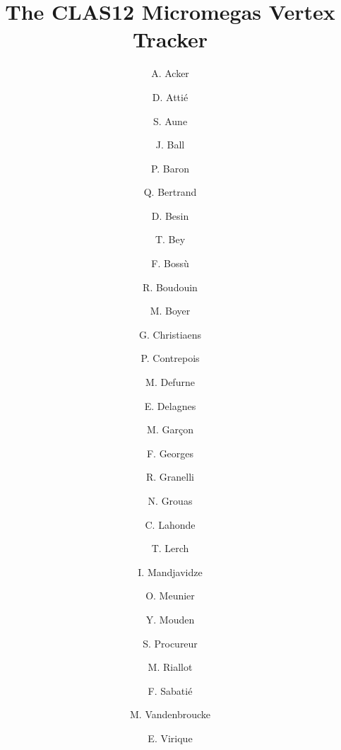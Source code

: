 \title{The CLAS12 Micromegas Vertex Tracker}

\author{A. Acker} 
\author{D. Atti\'e}
\author{S. Aune}
\author{J. Ball}
\author{P. Baron}
\author{Q. Bertrand}
\author{D. Besin}
\author{T. Bey}
\author{F. Boss\`u}
\author{R. Boudouin}
\author{M. Boyer}
\author{G. Christiaens}
\author{P. Contrepois}
\author{M. Defurne}
\author{E. Delagnes}
\author{M. Gar\c con}
\author{F. Georges}
\author{R. Granelli}
\author{N. Grouas}
\author{C. Lahonde}
\author{T. Lerch}
\author{I. Mandjavidze}
\author{O. Meunier}
\author{Y. Mouden}
\author{S. Procureur}
\author{M. Riallot}
\author{F. Sabati\'e}
\author{M. Vandenbroucke}
\author{E. Virique}

\address{IRFU, CEA, Universit\'{e} Paris-Saclay, 91191, Gif-sur-Yvette, France}
